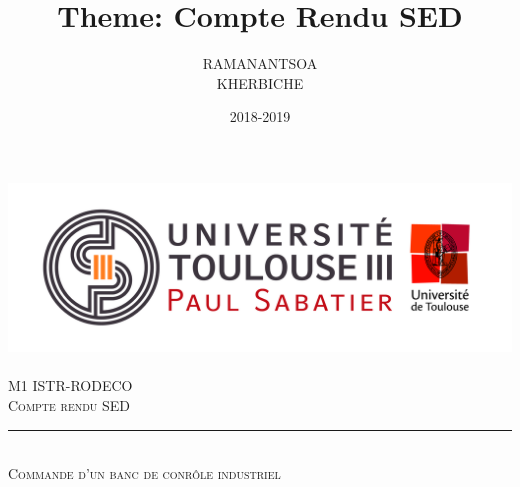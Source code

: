 \documentclass[12pt, a4paper, openany]{report}
\title{Theme: Compte Rendu SED}
\author{RAMANANTSOA \bsc{Loic} \\ KHERBICHE \bsc{Ali}}
\date{2018-2019}
\newcommand{\HRule}{\rule{\linewidth}{0.5mm}}
\begin{document}
\makeatletter
\begin{titlepage}
\begin{sffamily}
\begin{center}
    \includegraphics[scale=0.5]{Logo_UT3.jpg}~\\[1cm]
    \textsc{\LARGE M1 ISTR-RODECO  }\\[1cm]
    \textsc{\Large Compte rendu SED}\\[1cm]
    \HRule \\[0.4cm] %
    { \huge  \textsc {Commande d'un banc de conrôle industriel\\[0.4cm] }}


\end{center}
\end{sffamily}
\end{titlepage}
\end{document}
